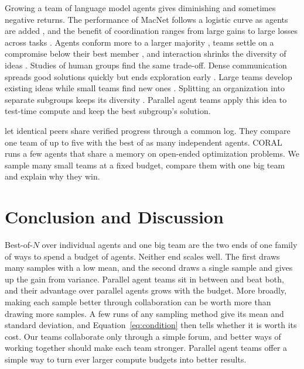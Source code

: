 \documentclass[numbers,10pt]{arxiv}
\renewcommand{\paragraph}[1]{\sansbf{#1}}
\begin{document}
\paragraph{Team size and diversity.} Growing a team of language model agents gives diminishing and sometimes negative returns. The performance of MacNet follows a logistic curve as agents are added \citep{qian2025macnet}, and the benefit of coordination ranges from large gains to large losses across tasks \citep{kim2025scaling}. Agents conform more to a larger majority \citep{weng2025conformity}, teams settle on a compromise below their best member \citep{pappu2026experts}, and interaction shrinks the diversity of ideas \citep{chen2026diversitycollapse}. Studies of human groups find the same trade-off. Dense communication spreads good solutions quickly but ends exploration early \citep{lazer2007network,bernstein2018intermittent}. Large teams develop existing ideas while small teams find new ones \citep{wu2019largeteams}. Splitting an organization into separate subgroups keeps its diversity \citep{fang2010subgroups}. Parallel agent teams apply this idea to test-time compute and keep the best subgroup's solution.

\paragraph{Concurrent work.} \citet{park2026communication} let identical peers share verified progress through a common log. They compare one team of up to five with the best of as many independent agents. CORAL \citep{qu2026coral} runs a few agents that share a memory on open-ended optimization problems. We sample many small teams at a fixed budget, compare them with one big team and explain why they win.

\section{Conclusion and Discussion}
\label{sec:limits}

Best-of-$N$ over individual agents and one big team are the two ends of one family of ways to spend a budget of agents. Neither end scales well. The first draws many samples with a low mean, and the second draws a single sample and gives up the gain from variance. Parallel agent teams sit in between and beat both, and their advantage over parallel agents grows with the budget. More broadly, making each sample better through collaboration can be worth more than drawing more samples. A few runs of any sampling method give its mean and standard deviation, and Equation~\ref{eq:condition} then tells whether it is worth its cost. Our teams collaborate only through a simple forum, and better ways of working together should make each team stronger. Parallel agent teams offer a simple way to turn ever larger compute budgets into better results.
\end{document}
